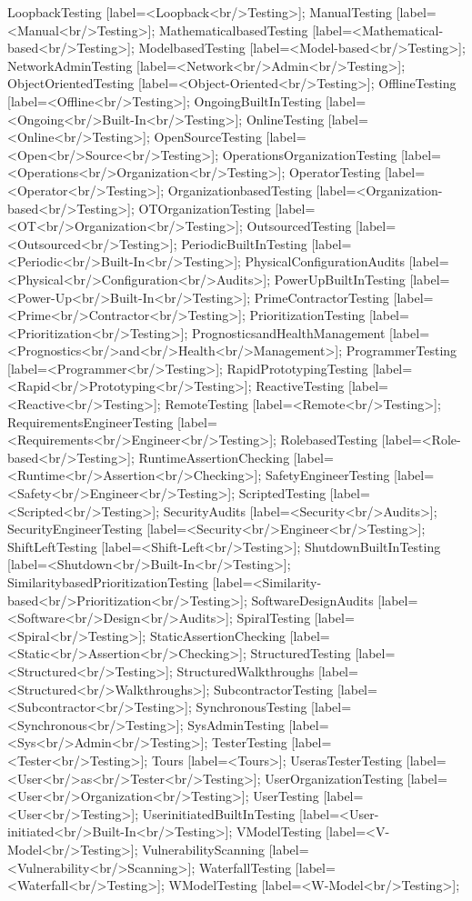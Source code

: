 \documentclass{article}
\begin{document}
{LoopbackTesting [label=<Loopback<br/>Testing>];
ManualTesting [label=<Manual<br/>Testing>];
MathematicalbasedTesting [label=<Mathematical-based<br/>Testing>];
ModelbasedTesting [label=<Model-based<br/>Testing>];
NetworkAdminTesting [label=<Network<br/>Admin<br/>Testing>];
ObjectOrientedTesting [label=<Object-Oriented<br/>Testing>];
OfflineTesting [label=<Offline<br/>Testing>];
OngoingBuiltInTesting [label=<Ongoing<br/>Built-In<br/>Testing>];
OnlineTesting [label=<Online<br/>Testing>];
OpenSourceTesting [label=<Open<br/>Source<br/>Testing>];
OperationsOrganizationTesting [label=<Operations<br/>Organization<br/>Testing>];
OperatorTesting [label=<Operator<br/>Testing>];
OrganizationbasedTesting [label=<Organization-based<br/>Testing>];
OTOrganizationTesting [label=<OT<br/>Organization<br/>Testing>];
OutsourcedTesting [label=<Outsourced<br/>Testing>];
PeriodicBuiltInTesting [label=<Periodic<br/>Built-In<br/>Testing>];
PhysicalConfigurationAudits [label=<Physical<br/>Configuration<br/>Audits>];
PowerUpBuiltInTesting [label=<Power-Up<br/>Built-In<br/>Testing>];
PrimeContractorTesting [label=<Prime<br/>Contractor<br/>Testing>];
PrioritizationTesting [label=<Prioritization<br/>Testing>];
PrognosticsandHealthManagement [label=<Prognostics<br/>and<br/>Health<br/>Management>];
ProgrammerTesting [label=<Programmer<br/>Testing>];
RapidPrototypingTesting [label=<Rapid<br/>Prototyping<br/>Testing>];
ReactiveTesting [label=<Reactive<br/>Testing>];
RemoteTesting [label=<Remote<br/>Testing>];
RequirementsEngineerTesting [label=<Requirements<br/>Engineer<br/>Testing>];
RolebasedTesting [label=<Role-based<br/>Testing>];
RuntimeAssertionChecking [label=<Runtime<br/>Assertion<br/>Checking>];
SafetyEngineerTesting [label=<Safety<br/>Engineer<br/>Testing>];
ScriptedTesting [label=<Scripted<br/>Testing>];
SecurityAudits [label=<Security<br/>Audits>];
SecurityEngineerTesting [label=<Security<br/>Engineer<br/>Testing>];
ShiftLeftTesting [label=<Shift-Left<br/>Testing>];
ShutdownBuiltInTesting [label=<Shutdown<br/>Built-In<br/>Testing>];
SimilaritybasedPrioritizationTesting [label=<Similarity-based<br/>Prioritization<br/>Testing>];
SoftwareDesignAudits [label=<Software<br/>Design<br/>Audits>];
SpiralTesting [label=<Spiral<br/>Testing>];
StaticAssertionChecking [label=<Static<br/>Assertion<br/>Checking>];
StructuredTesting [label=<Structured<br/>Testing>];
StructuredWalkthroughs [label=<Structured<br/>Walkthroughs>];
SubcontractorTesting [label=<Subcontractor<br/>Testing>];
SynchronousTesting [label=<Synchronous<br/>Testing>];
SysAdminTesting [label=<Sys<br/>Admin<br/>Testing>];
TesterTesting [label=<Tester<br/>Testing>];
Tours [label=<Tours>];
UserasTesterTesting [label=<User<br/>as<br/>Tester<br/>Testing>];
UserOrganizationTesting [label=<User<br/>Organization<br/>Testing>];
UserTesting [label=<User<br/>Testing>];
UserinitiatedBuiltInTesting [label=<User-initiated<br/>Built-In<br/>Testing>];
VModelTesting [label=<V-Model<br/>Testing>];
VulnerabilityScanning [label=<Vulnerability<br/>Scanning>];
WaterfallTesting [label=<Waterfall<br/>Testing>];
WModelTesting [label=<W-Model<br/>Testing>];


}
\end{document}
